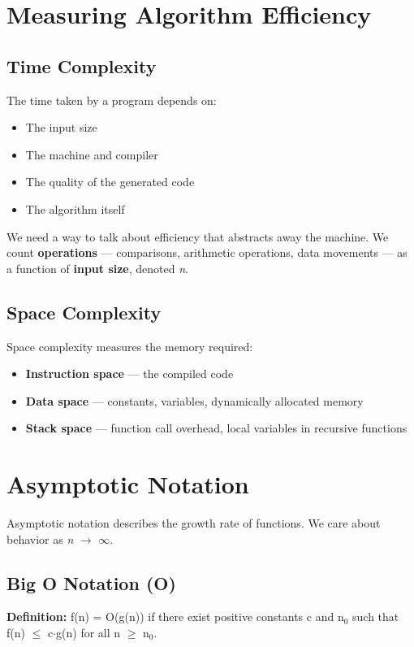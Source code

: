 \section{Measuring Algorithm Efficiency}

\subsection{Time Complexity}

The time taken by a program depends on:
\begin{itemize}
\item The input size
\item The machine and compiler
\item The quality of the generated code
\item The algorithm itself
\end{itemize}

We need a way to talk about efficiency that abstracts away the machine. We count \textbf{operations} — comparisons, arithmetic operations, data movements — as a function of \textbf{input size}, denoted \textit{n}.

\subsection{Space Complexity}

Space complexity measures the memory required:
\begin{itemize}
\item \textbf{Instruction space} — the compiled code
\item \textbf{Data space} — constants, variables, dynamically allocated memory
\item \textbf{Stack space} — function call overhead, local variables in recursive functions
\end{itemize}

\section{Asymptotic Notation}

Asymptotic notation describes the growth rate of functions. We care about behavior as \textit{n} $\to $ $\infty $.

\subsection{Big O Notation (O)}

\textbf{Definition:} f(n) = O(g(n)) if there exist positive constants c and n$_{0}$ such that f(n) $\le $ c$\cdot $g(n) for all n $\ge $ n$_{0}$.

